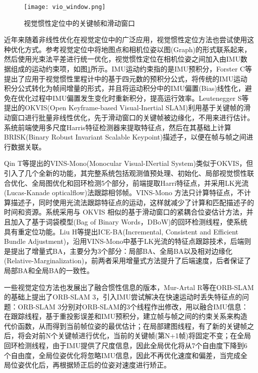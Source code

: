 \begin{figure}
  \centering
  \texttt{[image: vio\_window.png]}
  \caption{视觉惯性定位中的关键帧和滑动窗口}
  \label{fig:vio_window}
\end{figure}

近年来随着非线性优化在视觉定位中的广泛应用，视觉惯性定位方法也尝试使用这种优化方式。参考视觉定位中将地图点和相机位姿以图(Graph)的形式联系起来，然后使用光束法平差进行统一优化，视觉惯性定位在相机位姿之间加入由IMU数据组成的运动约束项，如图\ref{fig:vio_window}所示。IMU运动约束指的是IMU预积分，Forster C等\cite{forster2016manifold}提出了应用于视觉惯性里程计中的基于四元数的预积分公式，将传统的IMU运动积分公式转化为帧间增量的形式，并且将运动积分中的IMU偏置(Bias)线性化，避免在优化过程中IMU偏置发生变化时重新积分，提高运行效率。Leutenegger S等\cite{leutenegger2015keyframe}提出的OKVIS(Open Keyframe-based Visual-Inertial SLAM)利用基于关键帧的滑动窗口进行批量非线性优化，先于滑动窗口的关键帧被边缘化，不用来进行估计。系统前端使用多尺度Harris\cite{harris1988combined}特征检测器来提取特征点，然后在其基础上计算BRISK(Binary Robust Invariant Scalable Keypoint)\cite{leutenegger2011brisk}描述子，以便在帧与帧之间进行数据关联。

Qin T等\cite{qin2018vins}提出的VINS-Mono(Monocular Visual-INertial System)类似于OKVIS，但引入了几个全新的功能，其完整系统包括观测值预处理、初始化、局部视觉惯性联合优化、全局图优化和回环检测5个部分，前端提取Harri特征点，并采用LK光流(Lucas-Kanade opticalflow)\cite{lucas1981iterative}法跟踪相邻帧。VINS-Mono 方法只计算特征点，不计算描述子，同时使用光流法跟踪特征点的运动，这样就减少了计算和匹配描述子的时间和资源。系统采用与 OKVIS 相似的基于滑动窗口的紧耦合位姿估计方法，并且加入了基于词袋模型(Bag of Binary Words，DBoW)\cite{galvez2012bags}的回环检测线程，使系统具有重定位功能。Liu H等\cite{liu2018ice}提出ICE-BA(Incremental, Consistent and Efficient Bundle Adjustment)，沿用VINS-Mono中基于LK光流的特征点跟踪技术，后端则是提出了增量式BA，主要分为3个部分：局部BA、全局BA以及相对边缘化(Relative-Marginalization)，前两者采用增量式方法提升了后端速度，后者保证了局部BA和全局BA的一致性。

一些视觉定位方法也发展出了融合惯性信息的版本，Mur-Artal R等\cite{campos2021orb}在ORB-SLAM的基础上提出了ORB-SLAM 3，引入IMU尝试解决在快速运动时丢失特征点的问题：ORB-SLAM 3分别对ORB-SLAM的3个线程作出修改，用以融合IMU信息：在跟踪线程，基于重投影误差和IMU预积分，建立帧与帧之间的约束关系来构造代价函数，从而得到当前帧位姿的最优估计；在局部建图线程，有了新的关键帧之后，将会对前N个关键帧进行优化，当前的关键帧(第N+1帧)将固定不变；在全局回环检测线程，由于IMU提供了尺度信息，因此全局优化将从7个自由度下降到6个自由度，全局位姿优化将忽略IMU信息，因此不再优化速度和偏差，当完成全局位姿优化后，再根据矫正后的位姿对速度进行矫正。

